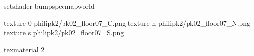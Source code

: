 setshader bumpspecmapworld

texture 0 philipk2/pk02_floor07_C.png
texture n philipk2/pk02_floor07_N.png
texture s philipk2/pk02_floor07_S.png

texmaterial 2
